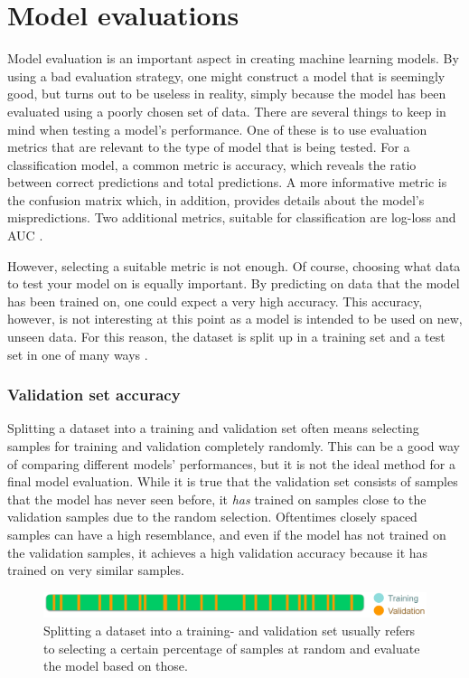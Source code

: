 \section{Model evaluations}
Model evaluation is an important aspect in creating machine learning models. By using a bad evaluation strategy, one might construct a model that is seemingly good, but turns out to be useless in reality, simply because the model has been evaluated using a poorly chosen set of data. There are several things to keep in mind when testing a model's performance. One of these is to use evaluation metrics that are relevant to the type of model that is being tested. For a classification model, a common metric is accuracy, which reveals the ratio between correct predictions and total predictions. A more informative metric is the confusion matrix which, in addition, provides details about the model's mispredictions. Two additional metrics, suitable for classification are log-loss and AUC \citep{zheng_2015}. 

However, selecting a suitable metric is not enough. Of course, choosing what data to test your model on is equally important. By predicting on data that the model has been trained on, one could expect a very high accuracy. This accuracy, however, is not interesting at this point as a model is intended to be used on new, unseen data. For this reason, the dataset is split up in a training set and a test set in one of many ways \citep{raschka}.


\subsubsection{Validation set accuracy}
Splitting a dataset into a training and validation set often means selecting samples for training and validation completely randomly. This can be a good way of comparing different models' performances, but it is not the ideal method for a final model evaluation. While it is true that the validation set consists of samples that the model has never seen before, it \textit{has} trained on samples close to the validation samples due to the random selection. Oftentimes closely spaced samples can have a high resemblance, and even if the model has not trained on the validation samples, it achieves a high validation accuracy because it has trained on very similar samples.

\begin{figure}[h]
	\centering
	\includegraphics[scale=0.3]{figs_temp/validation_split.jpg}
	\caption{Splitting a dataset into a training- and validation set usually refers to selecting a certain percentage of samples at random and evaluate the model based on those.}
	\label{fig:validation_split}
\end{figure}

